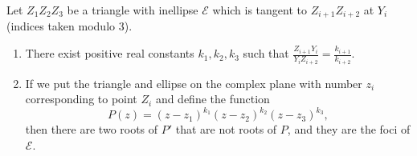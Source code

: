 Let $Z_1Z_2Z_3$ be a triangle with inellipse $\mathcal{E}$ which is tangent to $Z_{i+1}Z_{i+2}$ at $Y_i$ (indices taken modulo $3$).
\begin{enumerate}[label=(\alph*)]
	\item There exist positive real constants $k_1,k_2,k_3$ such that $\frac{Z_{i+1}Y_i}{Y_iZ_{i+2}}=\frac{k_{i+1}}{k_{i+2}}$.
	\item If we put the triangle and ellipse on the complex plane with number $z_i$ corresponding to point $Z_i$ and define the function \[P\left(z\right)=\left(z-z_1\right)^{k_1}\left(z-z_2\right)^{k_2}\left(z-z_3\right)^{k_3},\] then there are two roots of $P'$ that are not roots of $P$, and they are the foci of $\mathcal{E}$.
\end{enumerate}